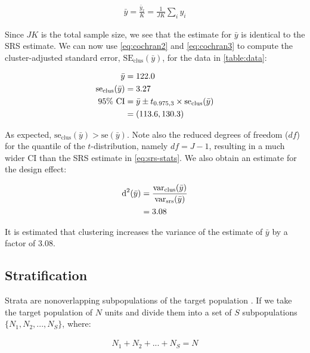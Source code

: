 \begin{align}
\label{eq:elmt-mean}
\bar{y}	=	\frac{\bar{y}_{\tau}}{K}	=	\frac{1}{JK} \sum_{i} y_{i}
\end{align}

Since $JK$ is the total sample size, we see that the estimate for $\bar{y}$ is identical to the SRS estimate. We can now use \autoref{eq:cochran2} and \autoref{eq:cochran3} to compute the cluster-adjusted standard error, $\text{SE}_{\text{clus}}(\bar{y})$, for the data in \autoref{table:data}:

\begin{align}
\label{eq:cluster-stats}
\bar{y}					&=		122.0												\\
\notag
\text{se}_{\text{clus}}(\bar{y})	&=		3.27												\\
\notag
95\%\text{ CI}				&=		\bar{y} \pm t_{0.975, 3} \times \text{se}_{\text{clus}}(\bar{y})		\\
\notag
						&=		(113.6, 130.3)
\end{align}

As expected, $\text{se}_{\text{clus}}(\bar{y}) > \text{se}(\bar{y})$. Note also the reduced degrees of freedom ($df$) for the quantile of the $t$-distribution, namely $df =  J - 1$, resulting in a much wider CI than the SRS estimate in \autoref{eq:srs-stats}. We also obtain an estimate for the design effect:

\begin{align}
\label{eq:cluster-deff}
\notag
\text{d}^{2}(\bar{y})			&=		\frac{\text{var}_{\text{clus}}(\bar{y})}{\text{var}_{\text{srs}}(\bar{y})}	\\
\notag
						&=		3.08													\\
\end{align}

It is estimated that clustering increases the variance of the estimate of $\bar{y}$ by a factor of 3.08.

\subsection{Stratification}

Strata are nonoverlapping subpopulations of the target population \citep{cochran1977}. If we take the target population of $N$ units and divide them into a set of $S$ subpopulations $\{ N_1, N_2, ..., N_S \}$, where:

\begin{align*}
N_1 + N_2 + ... + N_S = N
\end{align*}

